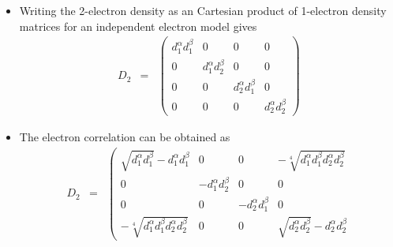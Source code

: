 \documentclass[aip,graphicx]{revtex4-1}
\begin{document}
\begin{itemize}
\begin{eqnarray}
\begin{matrix}
         c_{11}^2 & 0 & 0 & c_{11}c_{22} \\
         0 & 0 & 0 & 0 \\
         0 & 0 & 0 & 0 \\
         c_{22}c_{11} & 0 &0 & c_{22}^2
         \end{matrix}\right)
        \end{eqnarray}
        In terms of the 1-electron density matrix occupation numbers this can also be written as
        \begin{eqnarray}
        \label{Eq:D2-2el-2orb}
         D_{2} &=&
         \left(\begin{matrix}
         \sqrt{d_1^\alpha d_1^\beta} & 0 & 0 & -\sqrt[4]{d_1^\alpha d_1^\beta d_2^\alpha d_2^\beta} \\
         0 & 0 & 0 & 0 \\
         0 & 0 & 0 & 0 \\
         -\sqrt[4]{d_1^\alpha d_1^\beta d_2^\alpha d_2^\beta} & 0 &0 & \sqrt{d_2^\alpha d_2^\beta} 
         \end{matrix}\right)
        \end{eqnarray}
\item Writing the 2-electron density as an Cartesian product of 1-electron density matrices for an 
         independent electron model gives
         \begin{eqnarray}
         D_{2} &=&
         \left(\begin{matrix}
         d_1^\alpha d_1^\beta & 0 & 0 & 0\\
         0 & d_1^\alpha d_2^\beta & 0 & 0 \\
         0 & 0 & d_2^\alpha d_1^\beta & 0 \\
         0 & 0 &0 & d_2^\alpha d_2^\beta
         \end{matrix}\right)
        \end{eqnarray}
\item The electron correlation can be obtained as
         \begin{eqnarray}
         \label{Eq:Ecorrelation-2el-2orb}
         D_{2} &=&
         \left(\begin{matrix}
         \sqrt{d_1^\alpha d_1^\beta} - d_1^\alpha d_1^\beta & 0 & 0 & -\sqrt[4]{d_1^\alpha d_1^\beta d_2^\alpha d_2^\beta} \\
         0 & - d_1^\alpha d_2^\beta & 0 & 0 \\
         0 & 0 & - d_2^\alpha d_1^\beta & 0 \\
         -\sqrt[4]{d_1^\alpha d_1^\beta d_2^\alpha d_2^\beta} & 0 &0 & \sqrt{d_2^\alpha d_2^\beta} - d_2^\alpha d_2^\beta

\end{matrix}
\end{eqnarray}
\end{itemize}
\end{document}
